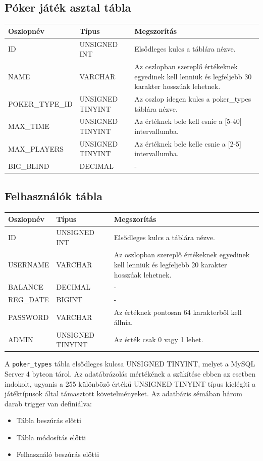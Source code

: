 \subsection{Póker játék asztal tábla}
\begin{tabular}{| C{3.8cm} | C{4.2cm} | C{6.1cm} |}
\hline
 \textbf{Oszlopnév} & \textbf{Típus} & \textbf{Megszorítás} \\ \hline
  ID & UNSIGNED INT & Elsődleges kulcs a táblára nézve. \\ \hline
  NAME & VARCHAR & Az oszlopban szereplő értékeknek egyedinek kell lenniük és legfeljebb 30 karakter hosszúak lehetnek.  \\ \hline
  POKER\_TYPE\_ID & UNSIGNED TINYINT & Az oszlop idegen kulcs a poker\_types táblára nézve. \\ \hline
  MAX\_TIME & UNSIGNED TINYINT & Az értéknek bele kell esnie a [5-40] intervallumba. \\ \hline
  MAX\_PLAYERS & UNSIGNED TINYINT & Az értéknek bele kelle esnie a [2-5] intervallumba. \\ \hline
  BIG\_BLIND & DECIMAL & - \\ \hline
\end{tabular}

\subsection{Felhasználók tábla}
\begin{tabular}{| C{3.8cm} | C{4.2cm} | C{6.1cm} |}
\hline
 \textbf{Oszlopnév} & \textbf{Típus} & \textbf{Megszorítás} \\ \hline
  ID & UNSIGNED INT & Elsődleges kulcs a táblára nézve. \\ \hline
  USERNAME & VARCHAR & Az oszlopban szereplő értékeknek egyedinek kell lenniük és legfeljebb 20 karakter hosszúak lehetnek.  \\ \hline
  BALANCE & DECIMAL & - \\ \hline
  REG\_DATE & BIGINT & - \\ \hline
  PASSWORD & VARCHAR & Az értéknek pontosan 64 karakterből kell állnia. \\ \hline
  ADMIN & UNSIGNED TINYINT & Az érték csak 0 vagy 1 lehet. \\ \hline
\end{tabular}

\hfill \break

A \texttt{poker\_types} tábla elsődleges kulcsa UNSIGNED TINYINT, melyet a MySQL Server 4 byteon tárol. Az adatábrázolás mértékének a szűkítése ebben az esetben indokolt, ugyanis a 255 különböző értékű UNSIGNED TINYINT típus kielégíti a játéktípusok által támasztott követelményeket. Az adatbázis sémában három darab trigger van definiálva:
\begin{itemize}
\item Tábla beszúrás előtti
\item Tábla módosítás előtti
\item Felhasználó beszúrás előtti
\end{itemize}


